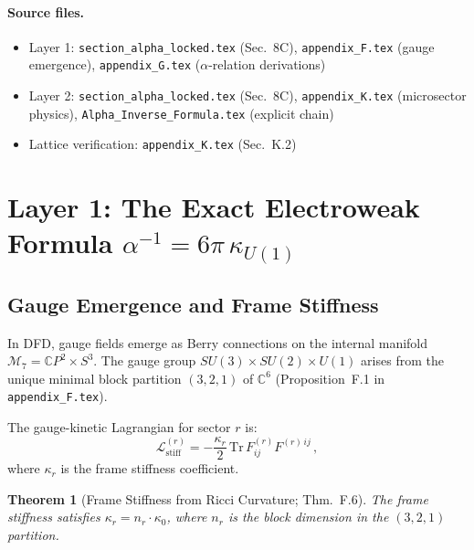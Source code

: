 \documentclass[12pt,a4paper]{article}
\newtheorem{theorem}{Theorem}
\begin{document}
\paragraph{Source files.}
\begin{itemize}
\item Layer 1: \texttt{section\_alpha\_locked.tex} (Sec.~8C),
  \texttt{appendix\_F.tex} (gauge emergence),
  \texttt{appendix\_G.tex} ($\alpha$-relation derivations)
\item Layer 2: \texttt{section\_alpha\_locked.tex} (Sec.~8C),
  \texttt{appendix\_K.tex} (microsector physics),
  \texttt{Alpha\_Inverse\_Formula.tex} (explicit chain)
\item Lattice verification: \texttt{appendix\_K.tex} (Sec.~K.2)
\end{itemize}

\section{Layer 1: The Exact Electroweak Formula $\alpha^{-1} = 6\pi\,\kappa_{U(1)}$}
\label{sec:layer1}

\subsection{Gauge Emergence and Frame Stiffness}

In DFD, gauge fields emerge as Berry connections on the internal
manifold $\mathcal{M}_7 = \mathbb{C}P^2 \times S^3$. The gauge group
$SU(3) \times SU(2) \times U(1)$ arises from the unique minimal
block partition $(3,2,1)$ of $\mathbb{C}^6$ (Proposition~F.1 in
\texttt{appendix\_F.tex}).

The gauge-kinetic Lagrangian for sector $r$ is:
\begin{equation}
\mathcal{L}^{(r)}_{\mathrm{stiff}}
  = -\frac{\kappa_r}{2}\,\mathrm{Tr}\,F^{(r)}_{ij} F^{(r)\,ij}\,,
\end{equation}
where $\kappa_r$ is the frame stiffness coefficient.

\begin{theorem}[Frame Stiffness from Ricci Curvature; Thm.~F.6]
\label{thm:frame-stiffness}
The frame stiffness satisfies $\kappa_r = n_r \cdot \kappa_0$,
where $n_r$ is the block dimension in the $(3,2,1)$ partition.
\end{theorem}
\end{document}
